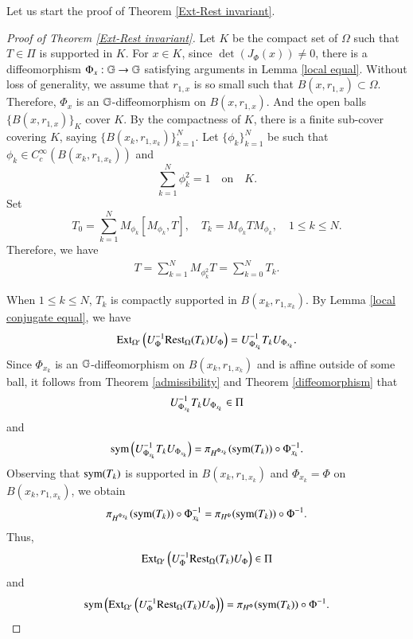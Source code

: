 \documentclass[leqno]{amsart}
\begin{document}
	
	
	
	
	Let us start the proof of Theorem \ref{Ext-Rest invariant}.
	\begin{proof}[Proof of Theorem \ref{Ext-Rest invariant}]
		Let $K$ be the compact set of $\Omega$ such that $T\in\Pi$ is supported in $K$. 
		For $x\in K$, since $\det(J_{\Phi}(x))\neq0$, there is a diffeomorphism $\Phi_{x}:\mathbb{G}\to\mathbb{G}$ satisfying arguments in Lemma \ref{local equal}. Without loss of generality, we assume that $r_{1,x}$ is so small such that $B(x,r_{1,x})\subset\Omega$. Therefore, $\Phi_{x}$ is an $\mathbb{G}$-diffeomorphism on $B(x,r_{1,x})$.
		And the open balls $\{B(x,r_{1,x})\}_{K}$ cover $K$. By the compactness of $K$, there is a finite sub-cover covering $K$, saying $\{B(x_{k},r_{1,x_{k}})\}_{k=1}^{N}$.
		Let $\{\phi_{k}\}_{k=1}^{N}$ be such that $\phi_{k}\in C_{c}^{\infty}(B(x_{k},r_{1,x_{k}}))$ and $$\sum_{k=1}^{N}\phi_{k}^{2}=1\quad\mbox{on}\quad K.$$
		Set $$T_{0}=\sum_{k=1}^{N}M_{\phi_{k}}[M_{\phi_{k}},T],\quad T_{k}=M_{\phi_{k}}T M_{\phi_{k}},\quad 1\leq k\leq N.$$
		Therefore, we have
		\begin{align}\label{local decomposition}
			T=\sum_{k=1}^{N}M_{\phi_{k}^{2}}T=\sum_{k=0}^{N}T_{k}.
		\end{align}
		
		When $1\leq k\leq N$, $T_{k}$ is compactly supported in $B(x_{k},r_{1,x_{k}})$. By Lemma \ref{local conjugate equal}, we have $${\rm Ext}_{\Omega'}\left(U_{\Phi}^{-1} {\rm Rest}_{\Omega}(T_{k}) U_{\Phi}\right)=U_{\Phi_{x_{k}}}^{-1} T_{k} U_{\Phi_{x_{k}}}.$$
		Since $\Phi_{x_{k}}$ is an $\mathbb{G}$-diffeomorphism on $B(x_{k},r_{1,x_{k}})$ and is affine outside of some ball, it follows from Theorem \ref{admissibility} and Theorem \ref{diffeomorphism} that $$U_{\Phi_{x_{k}}}^{-1} T_{k} U_{\Phi_{x_{k}}}\in\Pi$$ and $${\rm sym}\left(U_{\Phi_{x_{k}}}^{-1} T_{k} U_{\Phi_{x_{k}}}\right)=\pi_{H^{\Phi_{x_{k}}}}({\rm sym}(T_{k}))\circ\Phi_{x_{k}}^{-1}.$$
		Observing that ${\rm sym}(T_{k})$ is supported in $B(x_{k},r_{1,x_{k}})$ and $\Phi_{x_{k}}=\Phi$ on $B(x_{k},r_{1,x_{k}})$, we obtain $$\pi_{H^{\Phi_{x_{k}}}}({\rm sym}(T_{k}))\circ\Phi_{x_{k}}^{-1}=\pi_{H^{\Phi}}({\rm sym}(T_{k}))\circ\Phi^{-1}.$$
		Thus, 
		\begin{align}\label{local ext Tk}
			{\rm Ext}_{\Omega'}\left(U_{\Phi}^{-1} {\rm Rest}_{\Omega}(T_{k}) U_{\Phi}\right)\in\Pi
		\end{align} 
		and
		\begin{align}\label{local sym Tk}
			{\rm sym}\left({\rm Ext}_{\Omega'}\left(U_{\Phi}^{-1} {\rm Rest}_{\Omega}(T_{k}) U_{\Phi}\right)\right)=\pi_{H^{\Phi}}({\rm sym}(T_{k}))\circ\Phi^{-1}.
		\end{align}
		

\end{proof}
\end{document}
